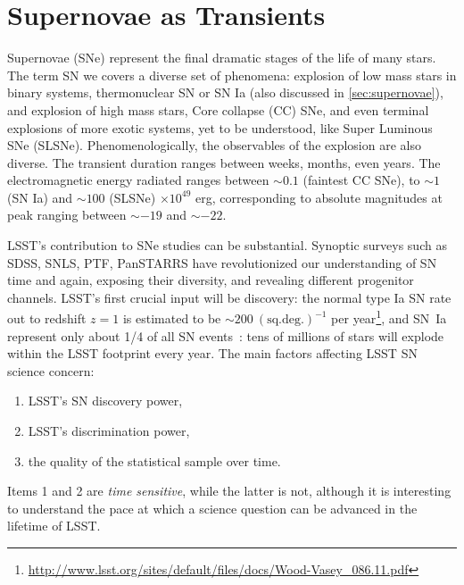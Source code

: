 %
%
%

\section{Supernovae as Transients}
\def\secname{\chpname:SNtransients}\label{sec:\secname}


Supernovae (SNe) represent the final dramatic stages of the life of many
stars. The term SN we covers a diverse set of phenomena: explosion of
low mass stars in binary systems, thermonuclear SN or SN Ia (also
discussed in \autoref{sec:supernovae}), and explosion of high mass stars,
Core collapse (CC) SNe, and even terminal explosions of more exotic
systems, yet to be understood, like Super Luminous SNe
(SLSNe). Phenomenologically, the observables of the explosion are
also diverse. The transient duration ranges between weeks,
months, even years. The electromagnetic energy radiated ranges between
$\sim0.1$ (faintest CC SNe), to $\sim1$ (SN Ia) and $\sim100$ (SLSNe)
$\times 10^{49}$ erg, corresponding to absolute magnitudes at peak
ranging between $\sim-19$ and $\sim-22$.

LSST's contribution to SNe studies can be substantial. Synoptic
surveys such as SDSS, SNLS, PTF, PanSTARRS have revolutionized our
understanding of SN time and again, exposing their diversity,
and revealing different progenitor channels. LSST's first crucial
input will be discovery: the normal type Ia SN rate out to redshift
$z=1$ is estimated to be $\sim200 ~(\mathrm{sq. deg.})^{-1}$ per
year\footnote{\url{http://www.lsst.org/sites/default/files/docs/Wood-Vasey_086.11.pdf}},
and SN~Ia represent only about 1/4 of all SN
events~\citep{Li11b}: tens of millions of stars will explode
within the LSST footprint every year. The main factors affecting 
LSST SN science concern:
\begin{enumerate}
\item
LSST's SN discovery power,
\item
LSST's discrimination power,
\item
the quality of the statistical sample over time.
\end{enumerate}
Items 1 and 2 are \emph{time sensitive}, while the latter
is not, although it is interesting to understand the pace at which a
science question can be advanced in the lifetime of LSST.


